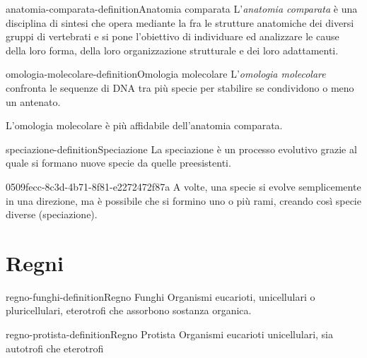 \documentclass[preview]{standalone}
\begin{document}
\begin{snippetdefinition}{anatomia-comparata-definition}{Anatomia comparata}
    L'\textit{anatomia comparata} è una disciplina di sintesi che 
    opera mediante la  fra le strutture anatomiche
    dei diversi gruppi di vertebrati e si pone l'obiettivo di individuare ed analizzare
    le cause della loro forma, della loro organizzazione strutturale e dei loro adattamenti.
\end{snippetdefinition}

\begin{snippetdefinition}{omologia-molecolare-definition}{Omologia molecolare}
    L'\textit{omologia molecolare} confronta le sequenze di DNA
    tra più specie per stabilire se condividono o meno un antenato.
\end{snippetdefinition}

\begin{plainhtml}
    L'omologia molecolare è più affidabile dell'anatomia comparata.
\end{plainhtml}

\begin{snippetdefinition}{speciazione-definition}{Speciazione}
    La speciazione è un processo evolutivo grazie al quale si formano nuove specie da quelle preesistenti. 
\end{snippetdefinition}

\begin{snippet}{0509fecc-8c3d-4b71-8f81-e2272472f87a}
    A volte, una specie si evolve semplicemente in una direzione, ma è possibile che si formino
    uno o più rami, creando così specie diverse (speciazione).
\end{snippet}


\section{Regni}

\begin{snippetdefinition}{regno-funghi-definition}{Regno Funghi}
    Organismi eucarioti, unicellulari o pluricellulari, eterotrofi
    che assorbono sostanza organica.
\end{snippetdefinition}

\begin{snippetdefinition}{regno-protista-definition}{Regno Protista}
    Organismi eucarioti unicellulari, sia autotrofi
    che eterotrofi
\end{snippetdefinition}
\end{document}
